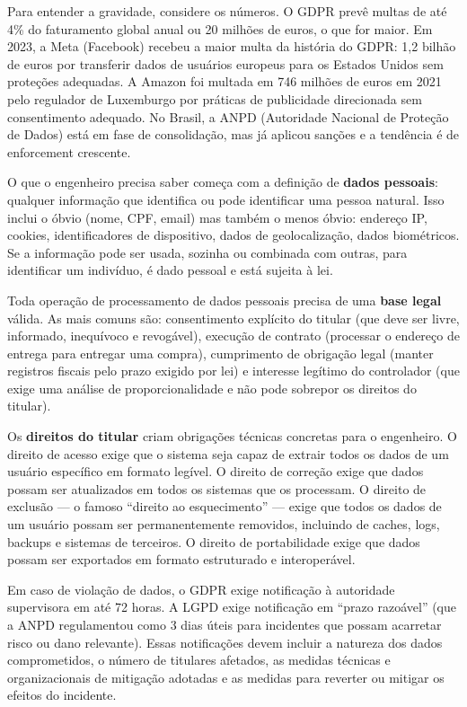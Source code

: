 Para entender a gravidade, considere os números. O GDPR prevê multas de até
4\% do faturamento global anual ou 20 milhões de euros, o que for maior.
Em 2023, a Meta (Facebook) recebeu a maior multa da história do GDPR: 1,2
bilhão de euros por transferir dados de usuários europeus para os Estados
Unidos sem proteções adequadas. A Amazon foi multada em 746 milhões de euros
em 2021 pelo regulador de Luxemburgo por práticas de publicidade direcionada
sem consentimento adequado. No Brasil, a ANPD (Autoridade Nacional de Proteção
de Dados) está em fase de consolidação, mas já aplicou sanções e a tendência é
de enforcement crescente.

O que o engenheiro precisa saber começa com a definição de \textbf{dados pessoais}:
qualquer informação que identifica ou pode identificar uma pessoa natural. Isso
inclui o óbvio (nome, CPF, email) mas também o menos óbvio: endereço IP, cookies,
identificadores de dispositivo, dados de geolocalização, dados biométricos. Se
a informação pode ser usada, sozinha ou combinada com outras, para identificar
um indivíduo, é dado pessoal e está sujeita à lei.

Toda operação de processamento de dados pessoais precisa de uma \textbf{base
legal} válida. As mais comuns são: consentimento explícito do titular
(que deve ser livre, informado, inequívoco e revogável), execução de contrato
(processar o endereço de entrega para entregar uma compra), cumprimento de
obrigação legal (manter registros fiscais pelo prazo exigido por lei) e
interesse legítimo do controlador (que exige uma análise de proporcionalidade
e não pode sobrepor os direitos do titular).

Os \textbf{direitos do titular} criam obrigações técnicas concretas para o
engenheiro. O direito de acesso exige que o sistema seja capaz de extrair todos
os dados de um usuário específico em formato legível. O direito de correção
exige que dados possam ser atualizados em todos os sistemas que os processam.
O direito de exclusão --- o famoso ``direito ao esquecimento'' --- exige que
todos os dados de um usuário possam ser permanentemente removidos, incluindo de
caches, logs, backups e sistemas de terceiros. O direito de portabilidade exige
que dados possam ser exportados em formato estruturado e interoperável.

Em caso de violação de dados, o GDPR exige notificação à autoridade supervisora
em até 72 horas. A LGPD exige notificação em ``prazo razoável'' (que a ANPD
regulamentou como 3 dias úteis para incidentes que possam acarretar risco ou
dano relevante). Essas notificações devem incluir a natureza dos dados
comprometidos, o número de titulares afetados, as medidas técnicas e
organizacionais de mitigação adotadas e as medidas para reverter ou mitigar os
efeitos do incidente.

